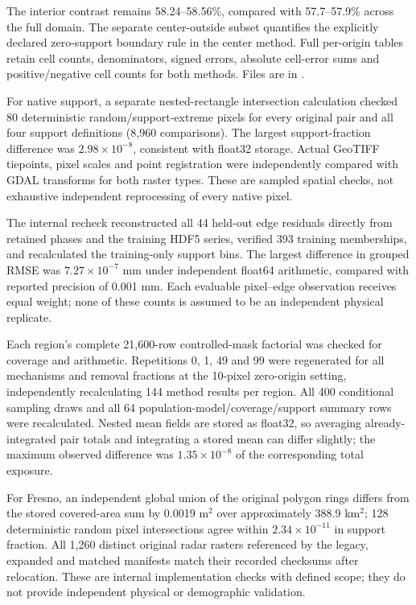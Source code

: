 \documentclass[10pt,a4paper]{article}
\newcommand{\UniformBiasMin}{57.7}
\newcommand{\UniformBiasMax}{57.9}
\newcommand{\InteriorBiasMin}{58.24}
\newcommand{\InteriorBiasMax}{58.56}
\begin{document}
The interior contrast remains \InteriorBiasMin{}--\InteriorBiasMax{}\%, compared with \UniformBiasMin{}--\UniformBiasMax{}\% across the full domain. The separate center-outside subset quantifies the explicitly declared zero-support boundary rule in the center method. Full per-origin tables retain cell counts, denominators, signed errors, absolute cell-error sums and positive/negative cell counts for both methods. Files are in .

For native support, a separate nested-rectangle intersection calculation checked 80 deterministic random/support-extreme pixels for every original pair and all four support definitions (8,960 comparisons). The largest support-fraction difference was $2.98\times10^{-8}$, consistent with float32 storage. Actual GeoTIFF tiepoints, pixel scales and point registration were independently compared with GDAL transforms for both raster types. These are sampled spatial checks, not exhaustive independent reprocessing of every native pixel.

The internal recheck reconstructed all 44 held-out edge residuals directly from retained phases and the training HDF5 series, verified 393 training memberships, and recalculated the training-only support bins. The largest difference in grouped RMSE was $7.27\times10^{-7}$ mm under independent float64 arithmetic, compared with reported precision of 0.001 mm. Each evaluable pixel--edge observation receives equal weight; none of these counts is assumed to be an independent physical replicate.

Each region's complete 21,600-row controlled-mask factorial was checked for coverage and arithmetic. Repetitions 0, 1, 49 and 99 were regenerated for all mechanisms and removal fractions at the 10-pixel zero-origin setting, independently recalculating 144 method results per region. All 400 conditional sampling draws and all 64 population-model/coverage/support summary rows were recalculated. Nested mean fields are stored as float32, so averaging already-integrated pair totals and integrating a stored mean can differ slightly; the maximum observed difference was $1.35\times10^{-8}$ of the corresponding total exposure.

For Fresno, an independent global union of the original polygon rings differs from the stored covered-area sum by 0.0019 m$^2$ over approximately 388.9 km$^2$; 128 deterministic random pixel intersections agree within $2.34\times10^{-11}$ in support fraction. All 1,260 distinct original radar rasters referenced by the legacy, expanded and matched manifests match their recorded checksums after relocation. These are internal implementation checks with defined scope; they do not provide independent physical or demographic validation.
\end{document}
